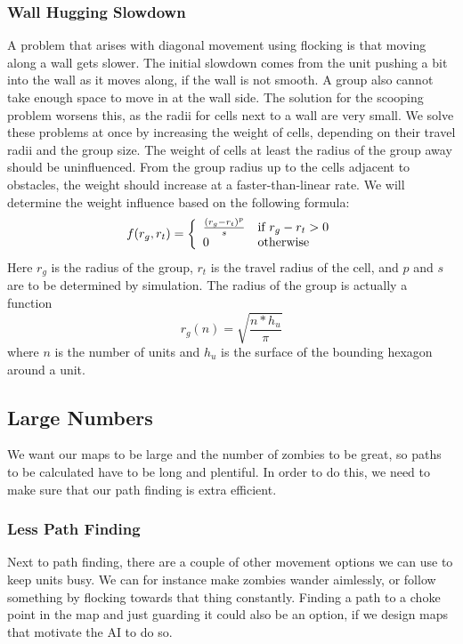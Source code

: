 \subsubsection{Wall Hugging Slowdown}
A problem that arises with diagonal movement using flocking is that moving along a wall gets slower. The initial slowdown comes from the unit pushing a bit into the wall as it moves along, if the wall is not smooth. A group also cannot take enough space to move in at the wall side. The solution for the scooping problem worsens this, as the radii for cells next to a wall are very small. We solve these problems at once by increasing the weight of cells, depending on their travel radii and the group size. The weight of cells at least the radius of the group away should be uninfluenced. From the group radius up to the cells adjacent to obstacles, the weight should increase at a faster-than-linear rate. We will determine the weight influence based on the following formula:
$$f(r_g, r_t) = \left\{\begin{array}{l l}
					\frac{(r_g - r_t)^p}{s} & \text{if } r_g - r_t > 0\\
					0 & \text{otherwise}
                \end{array}\right.
                $$
Here $r_g$ is the radius of the group, $r_t$ is the travel radius of the cell, and $p$ and $s$ are to be determined by simulation. The radius of the group is actually a function $$r_g(n) = \sqrt{\frac{n * h_u}{\pi}}$$ where $n$ is the number of units and $h_u$ is the surface of the bounding hexagon around a unit.

\subsection{Large Numbers}
We want our maps to be large and the number of zombies to be great, so paths to be calculated have to be long and plentiful. In order to do this, we need to make sure that our path finding is extra efficient.

\subsubsection{Less Path Finding}
Next to path finding, there are a couple of other movement options we can use to keep units busy. We can for instance make zombies wander aimlessly, or follow something by flocking towards that thing constantly. Finding a path to a choke point in the map and just guarding it could also be an option, if we design maps that motivate the AI to do so.

